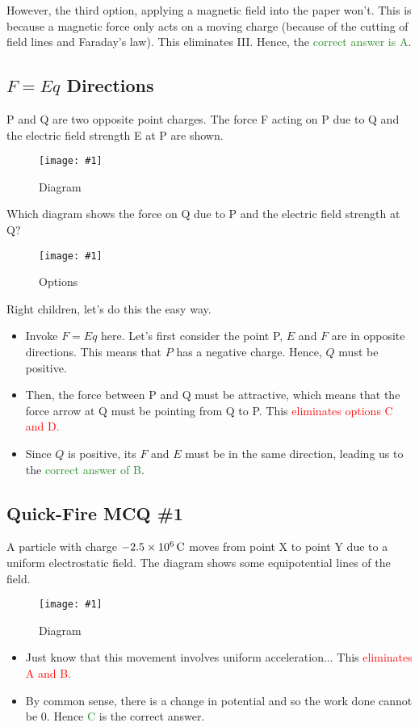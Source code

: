 \documentclass[a4paper,12pt]{article}
\newcommand{\img}[4]{\begin{center}
  \begin{figure}[H]
    \centering
    \texttt{[image: \#1]}
    \caption{#3}
    \label{fig:#4}
  \end{figure}
\end{center}}
\begin{document}
However, the third option, applying a magnetic field into the paper won't. This is because a magnetic force only acts on a moving charge (because of the cutting of field lines and Faraday's law). This eliminates III. Hence, the \textcolor{ForestGreen}{correct answer is A}.

\pagebreak

\subsection{\texorpdfstring{$F = Eq$}{F = Eq} Directions}

P and Q are two opposite point charges. The force F acting on P due to Q and the electric field strength E at P are shown.

\img{ex/6.png}{0.3}{Diagram}{ex6}

Which diagram shows the force on Q due to P and the electric field strength at Q?

\img{ex/7.png}{0.4}{Options}{ex7}

Right children, let's do this the easy way. \begin{itemize}
  \item Invoke $F = Eq$ here. Let's first consider the point P, $E$ and $F$ are in opposite directions. This means that $P$ has a negative charge. Hence, $Q$ must be positive.
  \item Then, the force between P and Q must be attractive, which means that the force arrow at Q must be pointing from Q to P. This \textcolor{red}{eliminates options C and D.}
  \item Since $Q$ is positive, its $F$ and $E$ must be in the same direction, leading us to the \textcolor{ForestGreen}{correct answer of B}.
\end{itemize}

\pagebreak

\subsection{Quick-Fire MCQ \#1}
A particle with charge $-\SI{2.5e6}{\C}$ moves from point X to point Y due to a uniform electrostatic field. The diagram shows some equipotential lines of the field.

\img{ex/8.png}{0.9}{Diagram}{ex8}

\begin{itemize}
  \item Just know that this movement involves uniform acceleration... This \textcolor{red}{eliminates A and B.}
  \item By common sense, there is a change in potential and so the work done cannot be 0. Hence \textcolor{ForestGreen}{C} is the correct answer.
\end{itemize}
\end{document}
